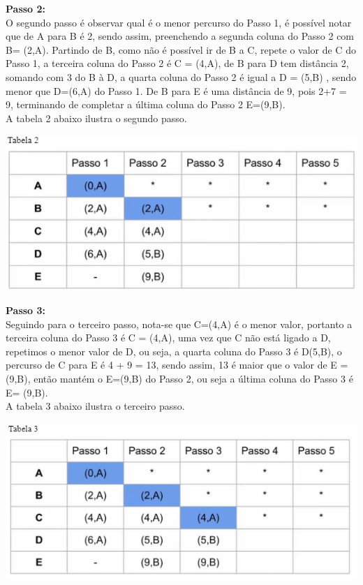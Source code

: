 \documentclass[11pt]{article} %
\begin{document}
\begin{enumerate}[a)]
\newpage

{\bf Passo 2:} \\

O segundo passo é observar qual é o menor percurso do Passo 1,  é possível notar que de A para B é 2, sendo assim, preenchendo a segunda coluna do Passo 2 com B= (2,A). Partindo de B, como não é possível ir de B a C, repete o valor de C do Passo 1, a terceira coluna do Passo 2 é C = (4,A), de B para D tem distância 2, somando com 3 do B à D, a quarta coluna do Passo 2 é igual a D = (5,B) , sendo menor que D=(6,A) do Passo 1. De B para E é uma distância de 9, pois 2+7 = 9, terminando de completar a última coluna do Passo 2  E=(9,B). \\ A tabela 2 abaixo ilustra o segundo passo. \\


		\begin{center}
			\includegraphics[scale = 0.9]{q2e2.png}
		\end{center}

\newpage

{\bf Passo 3:} \\

Seguindo para o terceiro passo, nota-se que C=(4,A) é o menor valor, portanto a terceira coluna do Passo 3 é C = (4,A),  uma vez que C não está ligado a D, repetimos o menor valor de D, ou seja, a quarta coluna do Passo 3 é D(5,B), o percurso de C para E é 4 + 9 = 13, sendo assim, 13 é maior que o valor de E = (9,B), então mantém o E=(9,B) do Passo 2, ou seja  a última coluna do Passo 3 é  E= (9,B).  \\ A tabela 3 abaixo ilustra o terceiro passo. \\

		\begin{center}
			\includegraphics[scale = 0.9]{q2e3.png}
		\end{center}


\end{enumerate}
\end{document}
